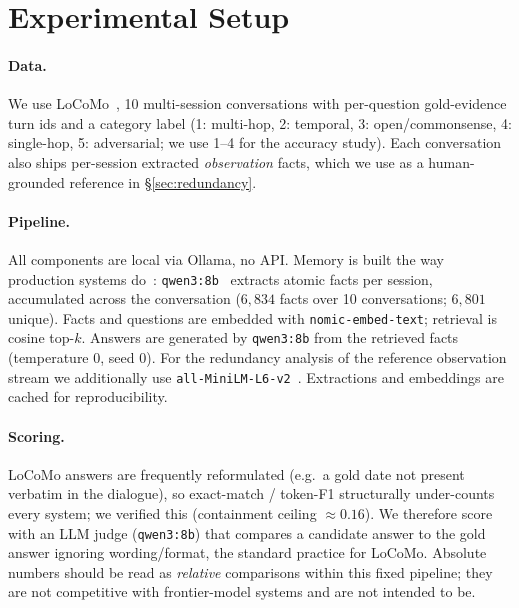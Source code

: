 \section{Experimental Setup}
\label{sec:setup}

\paragraph{Data.} We use LoCoMo~\cite{maharana2024locomo}, 10 multi-session
conversations with per-question gold-evidence turn ids and a category label
(1: multi-hop, 2: temporal, 3: open/commonsense, 4: single-hop, 5: adversarial;
we use 1--4 for the accuracy study). Each conversation also ships
per-session extracted \emph{observation} facts, which we use as a
human-grounded reference in \S\ref{sec:redundancy}.

\paragraph{Pipeline.} All components are local via Ollama, no API. Memory is
built the way production systems do~\cite{chhikara2025mem0,xu2025amem}:
\texttt{qwen3:8b}~\cite{qwen3} extracts atomic facts per session, accumulated
across the conversation ($6{,}834$ facts over 10 conversations; $6{,}801$
unique). Facts and
questions are embedded with \texttt{nomic-embed-text}; retrieval is cosine
top-$k$. Answers are generated by \texttt{qwen3:8b} from the retrieved facts
(temperature $0$, seed $0$). For the redundancy analysis of the reference
observation stream we additionally use
\texttt{all-MiniLM-L6-v2}~\cite{reimers2019sentencebert}. Extractions and
embeddings are cached for reproducibility.

\paragraph{Scoring.} LoCoMo answers are frequently reformulated (e.g.\ a gold
date not present verbatim in the dialogue), so exact-match / token-F1
structurally under-counts every system; we verified this (containment ceiling
$\approx\!0.16$). We therefore score with an LLM judge (\texttt{qwen3:8b}) that
compares a candidate answer to the gold answer ignoring wording/format, the
standard practice for LoCoMo. Absolute numbers should be read as
\emph{relative} comparisons within this fixed pipeline; they are not
competitive with frontier-model systems and are not intended to be.

